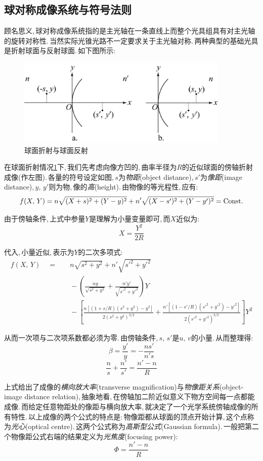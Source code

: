 \subsection{球对称成像系统与符号法则}
顾名思义,\,球对称成像系统指的是主光轴在一条直线上而整个光具组具有对主光轴的旋转对称性.\,当然实际光锥光路不一定要求关于主光轴对称.\,两种典型的基础光具是折射球面与反射球面.\,如下图所示:
\begin{figure}[H]
\centering
\includegraphics[width=0.9\textwidth]{image/5-7-3.png}
\caption{球面折射与球面反射}
\label{fig5-7-3}
\end{figure}

在球面折射情况\ref{fig5-7-3}下,\,我们先考虑向像方凹的,\,曲率半径为\(R\)的近似球面的傍轴折射成像(作左图).\,各量的符号设定如图,\,\(s\)为\emph{物距}(object distance),\,\(s'\)为\emph{像距}(image distance),\,\(y,\,y'\)则为物,\,像的\emph{高}(height).\,由物像的等光程性,\,应有:
\[f(X,\,Y)=n\sqrt{(X+s)^2+(Y-y)^2}+n'\sqrt{(X-s')^2+(Y-y')^2}={\rm Const.}\]

由于傍轴条件,\,上式中参量\(Y\)是理解为小量变量即可,\,而\(X\)近似为:
\[X=\frac{Y^2}{2R}\]

代入,\,小量近似,\,表示为\(Y\)的二次多项式:
\begin{align*}
f(X,\,Y)	\quad =  &\quad n\sqrt{s^2+y^2}+n'\sqrt{s'^2+y'^2}\\
			   		 &\quad -(\frac{ny}{\sqrt{s^2+y^2}}+\frac{n'y'}{\sqrt{s'^2+y'^2}})Y\\
			   		 &\quad -[\frac{n[(1+s/R)(s^2+y^2)-y^2]}{2(s^2+y^2)^{3/2}}+\frac{n'[(1-s'/R)(s'^2+y'^2)-y'^2]}{2(s'^2+y'^2)^{3/2}}]Y^2
\end{align*}

从而一次项与二次项系数都必须为零.\,由傍轴条件,\,\(s,\,s'\)是\(u,\,v\)的小量.\,从而整理得:
\[\beta=\frac{y'}{y}=-\frac{ns'}{n's}\]
\[\frac{n}{s}+\frac{n'}{s'}=\frac{n'-n}{R}\]

上式给出了成像的\emph{横向放大率}(transverse magnification)与\emph{物像距关系}(object-image distance relation),\,抽象地看,\,在傍轴加二阶近似意义下物方空间每一点都能成像.\,而给定任意物距处的像距与横向放大率,\,就决定了一个光学系统傍轴成像的所有特性.\,以上成像的两个公式的特点是:\,物像距都从球面的顶点开始计算,\,这个点称为\emph{光心}(optical centre).\,这两个公式称为\emph{高斯型公式}(Gaussian formula).\,一般把第二个物像距公式右端的结果定义为\emph{光焦度}(focusing power):
\[\varPhi=\frac{n'-n}{R}\]

